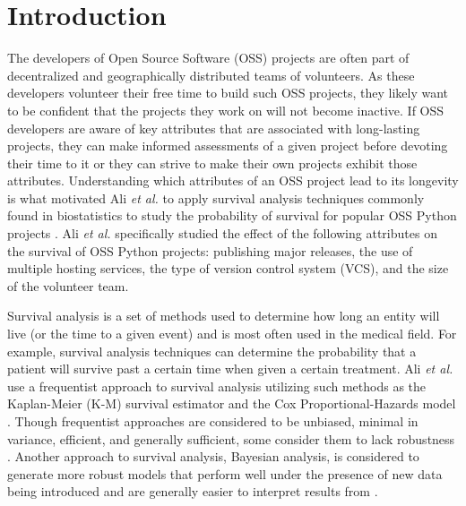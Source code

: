 \documentclass[acmconf]{acmart}
\begin{document}


\maketitle

\section{Introduction} \label{intro}
The developers of Open Source Software (OSS) projects are often part of decentralized and geographically distributed teams of volunteers.
As these developers volunteer their free time to build such OSS projects, they likely want to be confident that the projects they work on will not become inactive.
If OSS developers are aware of key attributes that are associated with long-lasting projects, they can make informed assessments of a given project before devoting their time to it or they can strive to make their own projects exhibit those attributes.
Understanding which attributes of an OSS project lead to its longevity is what motivated Ali \emph{et al.} to apply survival analysis techniques commonly found in biostatistics to study the probability of survival for popular OSS Python projects \cite{ali2020cheating}.
Ali \emph{et al.} specifically studied the effect of the following attributes on the survival of OSS Python projects: publishing major releases, the use of multiple hosting services, the type of version control system (VCS), and the size of the volunteer team.

Survival analysis is a set of methods used to determine how long an entity will live (or the time to a given event) and is most often used in the medical field.
For example, survival analysis techniques can determine the probability that a patient will survive past a certain time when given a certain treatment. 
Ali \emph{et al.} use a frequentist approach to survival analysis utilizing such methods as the Kaplan-Meier (K-M) survival estimator and the Cox Proportional-Hazards model \cite{kaplan1958nonparametric, cox1972regression}.
Though frequentist approaches are considered to be unbiased, minimal in variance, efficient, and generally sufficient, some consider them to lack robustness \cite{renganathan2016overview}.
Another approach to survival analysis, Bayesian analysis, is considered to generate more robust models that perform well under the presence of new data being introduced and are generally easier to interpret results from \cite{renganathan2016overview}.
\end{document}
